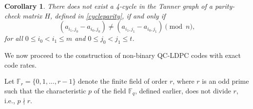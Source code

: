 \documentclass[conference]{IEEEtran}
\newtheorem{corollary}{Corollary}
\begin{document}
\begin{corollary}\label{4-cyclecoro}
   There does not exist a 4-cycle in the Tanner graph of a parity-check matrix $H$, defined in \eqref{cycleparity}, if and only if   \begin{equation*}
       (a_{i_{1},j_{0}}-a_{i_{0},j_{0}}) \neq (a_{i_{1},j_{1}}-a_{i_{0},j_{1}})\pmod{n},
   \end{equation*}
for all $0\leq i_{0}<i_{1}\leq m$ and $0\leq j_{0}<j_{1}\leq t$.
\end{corollary}
We now proceed to the construction of non-binary QC-LDPC codes with exact code rates.

Let $\mathbb{F}_{r} = \{0, 1, \ldots, r-1\}$ denote the finite field of order $r$, where $r$ is an odd prime such that the characteristic $p$ of the field $\mathbb{F}_{q}$, defined earlier, does not divide $r$, i.e., $p\nmid r$.
\end{document}
